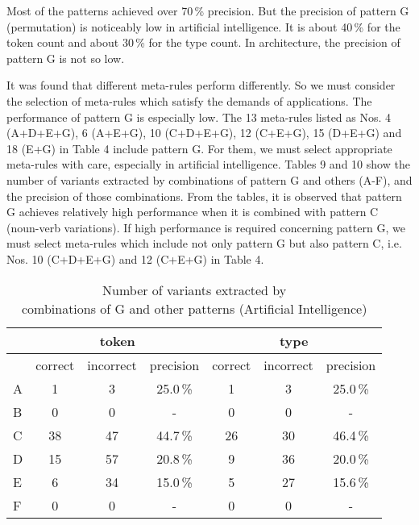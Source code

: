 Most of the patterns achieved over 70\,\% precision. But the precision of pattern G (permutation) is noticeably low in artificial intelligence. It is about 40\,\% for the token count and about 30\,\% for the type count. In architecture, the precision of pattern G is not so low.

It was found that different meta-rules perform differently. So we must consider the selection of meta-rules which satisfy the demands of applications. The performance of pattern G is especially low. The 13 meta-rules listed as Nos. 4 (A+D+E+G), 6 (A+E+G), 10 (C+D+E+G), 12 (C+E+G), 15 (D+E+G) and 18 (E+G) in Table 4 include pattern G. For them, we must select appropriate meta-rules with care, especially in artificial intelligence. Tables 9 and 10 show the number of variants extracted by combinations of pattern G and others (A-F), and the precision of those combinations. From the tables, it is observed that pattern G achieves relatively high performance when it is combined with pattern C (noun-verb variations). If high performance is required concerning pattern G, we must select meta-rules which include not only pattern G but also pattern C, i.e. Nos. 10 (C+D+E+G) and 12 (C+E+G) in Table 4.

\begin{table*}[htb]
\begin{center}
\begin{tabular}{l|ccc|ccc}
\hline
& \multicolumn{3}{|c}{token} & \multicolumn{3}{|c}{type}\\
\hline
& correct & incorrect & precision & correct & incorrect & precision\\
\hline
\hline
A & 1 & 3 & 25.0\,\% & 1 & 3 & 25.0\,\%\\
B & 0 & 0 & - & 0 & 0 & -\\
C & 38 & 47 & 44.7\,\% & 26 & 30 & 46.4\,\%\\
D & 15 & 57 & 20.8\,\% & 9 & 36 & 20.0\,\%\\
E & 6 & 34 & 15.0\,\% & 5 & 27 & 15.6\,\%\\
F & 0 & 0 & - & 0 & 0 & -\\
\hline
\end{tabular}

\end{center}
\caption{Number of variants extracted by \\ combinations of G and other patterns (Artificial Intelligence)}
\end{table*}

